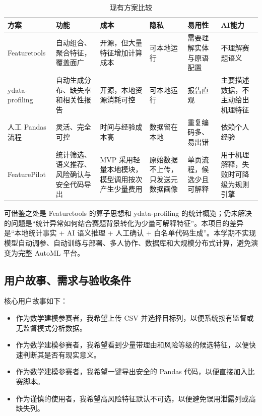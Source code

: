 \documentclass[UTF8,12pt,a4paper]{ctexart}
\begin{document}
\begin{table}[htbp]
\centering
\caption{现有方案比较}\label{tab:compare}
\small
\begin{tabularx}{\textwidth}{p{2.5cm}YYYYY}
\toprule
方案 & 功能 & 成本 & 隐私 & 易用性 & AI能力 \\
\midrule
Featuretools & 自动组合、聚合特征，覆盖面广 & 开源，但大量特征增加计算成本 & 可本地运行 & 需要理解实体与原语配置 & 不理解赛题语义 \\
ydata-profiling & 自动生成分布、缺失率和相关性报告 & 开源，本地资源消耗可控 & 可本地运行 & 报告直观 & 主要描述数据，不主动给出机理特征 \\
人工 Pandas 流程 & 灵活、完全可控 & 时间与经验成本高 & 数据留在本地 & 重复编码多、易出错 & 依赖个人经验 \\
FeaturePilot & 统计筛选、语义推荐、风险确认与安全代码导出 & MVP 采用轻量本地模块，模型调用按次产生少量费用 & 原始数据不上传，只发送元数据画像 & 单页流程，候选少且可解释 & 用于机理解释，失败时可降级为规则引擎 \\
\bottomrule
\end{tabularx}
\end{table}

可借鉴之处是 Featuretools 的算子思想和 ydata-profiling 的统计概览；仍未解决的问题是“统计异常如何结合赛题背景转化为少量可解释特征”。本项目的差异是“本地统计事实 + AI 语义推理 + 人工确认 + 白名单代码生成”。本学期不实现模型自动调参、自动训练与部署、多人协作、数据库和大规模分布式计算，避免演变为完整 AutoML 平台。

\subsection{用户故事、需求与验收条件}

核心用户故事如下：
\begin{itemize}
  \item 作为数学建模参赛者，我希望上传 CSV 并选择目标列，以便系统按有监督或无监督模式分析数据。
  \item 作为数学建模参赛者，我希望看到少量带理由和风险等级的候选特征，以便快速判断其是否有现实意义。
  \item 作为数学建模参赛者，我希望一键导出安全的 Pandas 代码，以便直接加入比赛脚本。
  \item 作为谨慎的使用者，我希望高风险特征默认不可选，以便避免误用泄露列或高缺失列。
\end{itemize}
\end{document}
